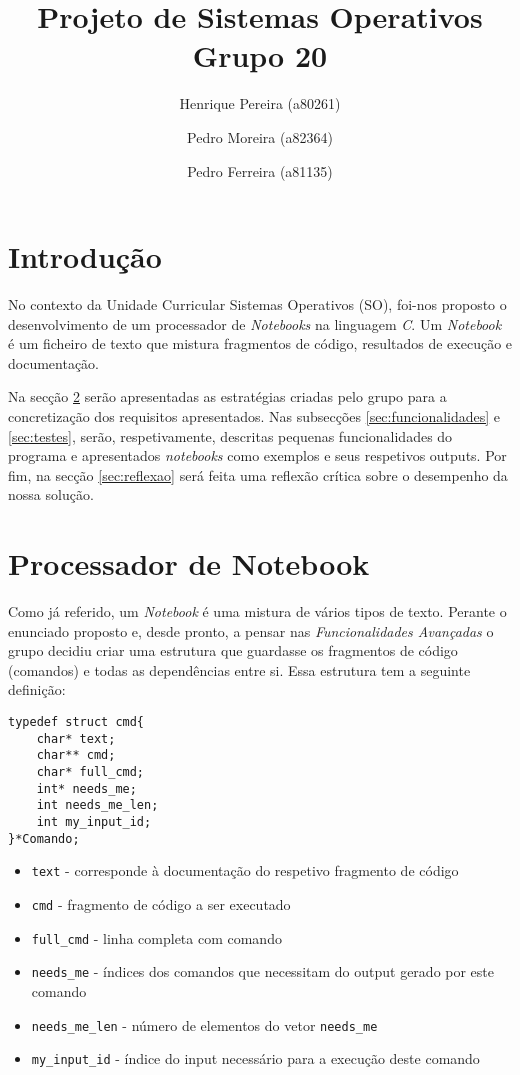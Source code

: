\documentclass[a4paper]{article}
\title{Projeto de Sistemas Operativos\\Grupo 20}
\author{Henrique Pereira (a80261) \and Pedro Moreira (a82364) \and Pedro Ferreira (a81135) }
\begin{document}
\maketitle

\newpage

\tableofcontents

\newpage

\section{Introdução}
\label{sec:intro}

No contexto da Unidade Curricular Sistemas Operativos (SO), foi-nos proposto o desenvolvimento de um processador de \textit{Notebooks} na linguagem \textit{C}. 
Um \textit{Notebook} é um ficheiro de texto que mistura fragmentos de código, resultados de execução e documentação. 


Na secção \ref{sec:note} serão apresentadas as estratégias criadas pelo grupo para a concretização dos requisitos apresentados.
Nas subsecções \ref{sec:funcionalidades} e \ref{sec:testes}, serão, respetivamente, descritas pequenas funcionalidades do programa e 
apresentados \textit{notebooks} como exemplos e seus respetivos outputs.
Por fim, na secção \ref{sec:reflexao} será feita uma reflexão crítica sobre o desempenho da nossa solução.


\section{Processador de Notebook}
\label{sec:note}

Como já referido, um \textit{Notebook} é uma mistura de vários tipos de texto. Perante o enunciado proposto e, desde pronto, a pensar 
nas \textit{Funcionalidades Avançadas} o grupo decidiu criar uma estrutura que guardasse os fragmentos de código (comandos) e todas as 
dependências entre si.
Essa estrutura tem a seguinte definição: 

\begin{lstlisting}[caption=Definição da estrutura]
typedef struct cmd{
    char* text;
    char** cmd;
    char* full_cmd; 
    int* needs_me;
    int needs_me_len;
    int my_input_id;
}*Comando;
\end{lstlisting}

\begin{itemize}
  \item{\texttt{text} - corresponde à documentação do respetivo fragmento de código}
  \item{\texttt{cmd} - fragmento de código a ser executado}
  \item{\texttt{full\_cmd} - linha completa com comando}
  \item{\texttt{needs\_me} - índices dos comandos que necessitam do output gerado por este comando}
  \item{\texttt{needs\_me\_len} - número de elementos do vetor \texttt{needs\_me}} 
  \item{\texttt{my\_input\_id} - índice do input necessário para a execução deste comando}
\end{itemize}
\end{document}

